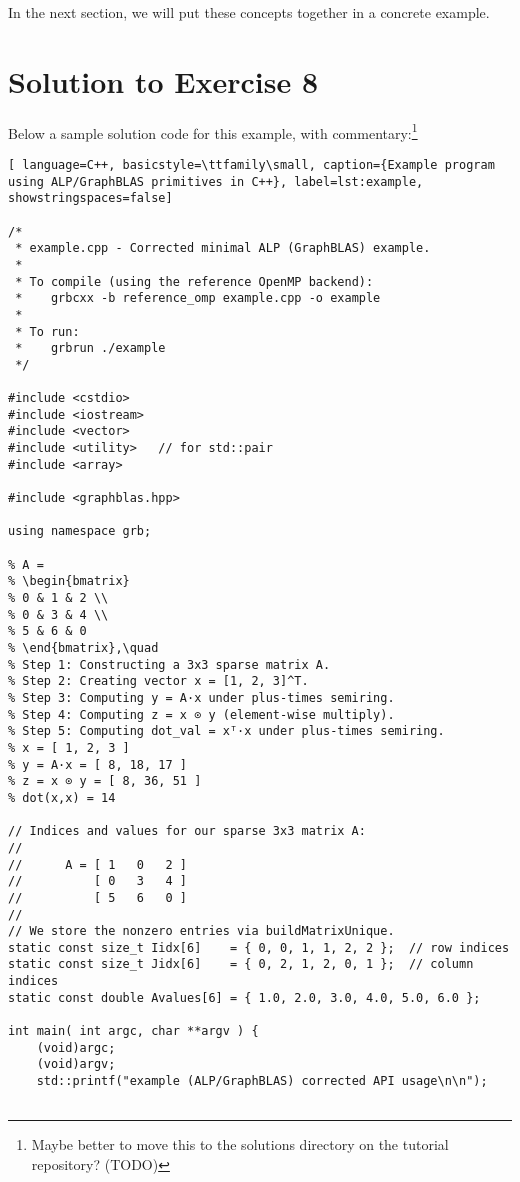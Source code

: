 In the next section, we will put these concepts together in a concrete example.


\section{Solution to Exercise 8}\label{sec:simple_example}

Below a sample solution code for this example, with commentary:\footnote{Maybe better to move this to the solutions directory on the tutorial repository? (TODO)}

\begin{lstlisting}[ language=C++, basicstyle=\ttfamily\small, caption={Example program using ALP/GraphBLAS primitives in C++}, label=lst:example, showstringspaces=false]

/*
 * example.cpp - Corrected minimal ALP (GraphBLAS) example.
 *
 * To compile (using the reference OpenMP backend):
 *    grbcxx -b reference_omp example.cpp -o example
 *
 * To run:
 *    grbrun ./example
 */

#include <cstdio>
#include <iostream>
#include <vector>
#include <utility>   // for std::pair
#include <array>

#include <graphblas.hpp>

using namespace grb;

% A = 
% \begin{bmatrix}
% 0 & 1 & 2 \\
% 0 & 3 & 4 \\
% 5 & 6 & 0
% \end{bmatrix},\quad
% Step 1: Constructing a 3x3 sparse matrix A.
% Step 2: Creating vector x = [1, 2, 3]^T.
% Step 3: Computing y = A·x under plus‐times semiring.
% Step 4: Computing z = x ⊙ y (element‐wise multiply).
% Step 5: Computing dot_val = xᵀ·x under plus‐times semiring.
% x = [ 1, 2, 3 ]
% y = A·x = [ 8, 18, 17 ]
% z = x ⊙ y = [ 8, 36, 51 ]
% dot(x,x) = 14

// Indices and values for our sparse 3x3 matrix A:
//
//      A = [ 1   0   2 ]
//          [ 0   3   4 ]
//          [ 5   6   0 ]
//
// We store the nonzero entries via buildMatrixUnique.
static const size_t Iidx[6]    = { 0, 0, 1, 1, 2, 2 };  // row indices
static const size_t Jidx[6]    = { 0, 2, 1, 2, 0, 1 };  // column indices
static const double Avalues[6] = { 1.0, 2.0, 3.0, 4.0, 5.0, 6.0 };

int main( int argc, char **argv ) {
    (void)argc;
    (void)argv;
    std::printf("example (ALP/GraphBLAS) corrected API usage\n\n");


\end{lstlisting}
